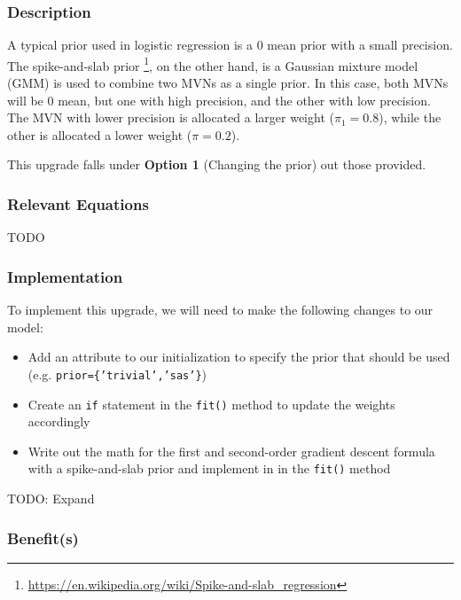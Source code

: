 \documentclass[12pt]{extarticle}
\begin{document}
\subsubsection{Description}

A typical prior used in logistic regression is a 0 mean prior with a small precision. The spike-and-slab prior \footnote{\url{https://en.wikipedia.org/wiki/Spike-and-slab_regression}}, on the other hand, is a Gaussian mixture model (GMM) is used to combine two MVNs as a single prior. In this case, both MVNs will be 0 mean, but one with high precision, and the other with low precision. The MVN with lower precision is allocated a larger weight ($\pi_1 = 0.8$), while the other is allocated a lower weight ($\pi = 0.2$).

This upgrade falls under \textbf{Option 1} (Changing the prior) out those provided.

\subsubsection{Relevant Equations}

TODO

\subsubsection{Implementation}

To implement this upgrade, we will need to make the following changes to our model:

\begin{itemize}
\item Add an attribute to our initialization to specify the prior that should be used (e.g. \texttt{prior=\{'trivial','sas'\}})
\item Create an \texttt{if} statement in the \texttt{fit()} method to update the weights accordingly
\item Write out the math for the first and second-order gradient descent formula with a spike-and-slab prior and implement in in the \texttt{fit()} method
\end{itemize}

TODO: Expand

\subsubsection{Benefit(s)}
\end{document}
